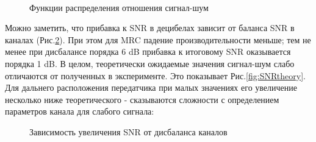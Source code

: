 \documentclass[a4paper,12pt,oneside, abstract=true]{scrartcl}
\begin{document}
\begin{figure}[!htb]
\begin{minipage}[h]{0.49\linewidth}
\end{minipage}
\begin{minipage}[h]{0.49\linewidth}
 \\
\end{minipage}
\caption{Функции распределения отношения сигнал-шум}
\label{fig:cdfs}
\end{figure}

Можно заметить, что прибавка к SNR в децибелах зависит от баланса SNR в каналах (Рис.\ref{fig:snrbalance}). 
При этом для MRC падение производительности меньше; тем не менее при дисбалансе порядка 6 dB прибавка к итоговому SNR оказывается порядка 1 dB. 
В целом, теоретически ожидаемые значения сигнал-шум слабо отличаются от полученных в эксперименте.
Это показывает Рис.\ref{fig:SNRtheory}. 
Для дальнего расположения передатчика при малых значениях его увеличение несколько ниже теоретического - сказываются сложности с определением параметров канала для слабого сигнала: 

\begin{figure}[h!]
\caption{Зависимость увеличения SNR от дисбаланса каналов}
\label{fig:snrbalance}
\end{figure}
\end{document}
